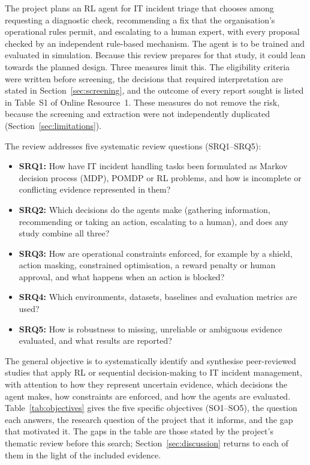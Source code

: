 \documentclass[pdflatex,sn-basic]{sn-jnl}
\begin{document}
The project plans an RL agent for IT incident triage that chooses among requesting a diagnostic check, recommending a fix that the organisation's operational rules permit, and escalating to a human expert, with every proposal checked by an independent rule-based mechanism. The agent is to be trained and evaluated in simulation. Because this review prepares for that study, it could lean towards the planned design. Three measures limit this. The eligibility criteria were written before screening, the decisions that required interpretation are stated in Section~\ref{sec:screening}, and the outcome of every report sought is listed in Table~S1 of Online Resource~1. These measures do not remove the risk, because the screening and extraction were not independently duplicated (Section~\ref{sec:limitations}).

The review addresses five systematic review questions (SRQ1--SRQ5):
\begin{itemize}
\item \textbf{SRQ1:} How have IT incident handling tasks been formulated as Markov decision process (MDP), POMDP or RL problems, and how is incomplete or conflicting evidence represented in them?
\item \textbf{SRQ2:} Which decisions do the agents make (gathering information, recommending or taking an action, escalating to a human), and does any study combine all three?
\item \textbf{SRQ3:} How are operational constraints enforced, for example by a shield, action masking, constrained optimisation, a reward penalty or human approval, and what happens when an action is blocked?
\item \textbf{SRQ4:} Which environments, datasets, baselines and evaluation metrics are used?
\item \textbf{SRQ5:} How is robustness to missing, unreliable or ambiguous evidence evaluated, and what results are reported?
\end{itemize}

The general objective is to systematically identify and synthesise peer-reviewed studies that apply RL or sequential decision-making to IT incident management, with attention to how they represent uncertain evidence, which decisions the agent makes, how constraints are enforced, and how the agents are evaluated. Table~\ref{tab:objectives} gives the five specific objectives (SO1--SO5), the question each answers, the research question of the project that it informs, and the gap that motivated it. The gaps in the table are those stated by the project's thematic review before this search; Section~\ref{sec:discussion} returns to each of them in the light of the included evidence.
\end{document}
